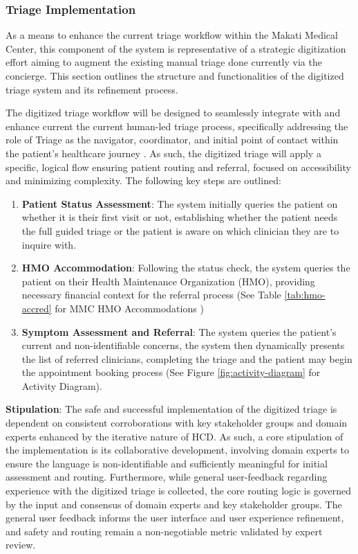 \documentclass[11pt,a4paper,titlepage]{article}
\begin{document}
	\subsubsection{Triage Implementation}
	As a means to enhance the current triage workflow within the Makati Medical Center, this component of the system is representative of a strategic digitization effort aiming to augment the existing manual triage done currently via the concierge. This section outlines the structure and functionalities of the digitized triage system and its refinement process. 

	The digitized triage workflow will be designed to seamlessly integrate with and enhance current the current human-led triage process, specifically addressing the role of Triage as the navigator, coordinator, and initial point of contact within the patient's healthcare journey \cite{Lajeunesse2012}. As such, the digitized triage will apply a specific, logical flow ensuring patient routing and referral, focused on accessibility and minimizing complexity. The following key steps are outlined: 
	\begin{enumerate}
		\item \textbf{Patient Status Assessment}: The system initially queries the patient on whether it is their first visit or not, establishing whether the patient needs the full guided triage or the patient is aware on which clinician they are to inquire with. 
		\item  \textbf{HMO Accommodation}: Following the status check, the system queries the patient on their Health Maintenance Organization (HMO), providing necessary financial context for the referral process (See Table \ref{tab:hmo-accred} for MMC HMO Accommodations \cite{makatimedicalcenter_doctors})
		\item \textbf{Symptom Assessment and Referral}: The system queries the patient's current and non-identifiable concerns, the system then dynamically presents the list of referred clinicians, completing the triage and the patient may begin the appointment booking process (See Figure \ref{fig:activity-diagram} for Activity Diagram). 
	\end{enumerate}	
	\textbf{Stipulation}: The safe and successful implementation of the digitized triage is dependent on consistent corroborations with key stakeholder groups and domain experts enhanced by the iterative nature of HCD. As such, a core stipulation of the implementation is its collaborative development, involving domain experts to ensure the language is non-identifiable and sufficiently meaningful for initial assessment and routing. Furthermore, while general user-feedback regarding experience with the digitized triage is collected, the core routing logic is governed by the input and consensus of domain experts and key stakeholder groups. The general user feedback informs the user interface and user experience refinement, and safety and routing remain a non-negotiable metric validated by expert review.
	
\end{document}
